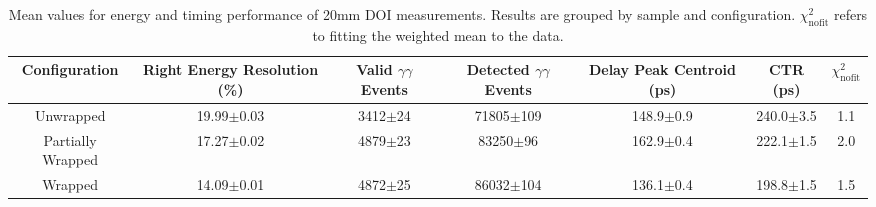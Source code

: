 \begin{table}
\caption{\label{tab:doictrresults-20} Mean values for energy and timing performance of 20mm DOI measurements. Results are grouped by sample and configuration. $\chi^2_\text{nofit}$ refers to fitting the weighted mean to the data.}
\begin{tabular}{ccccccc}
\hline
Configuration & Right Energy Resolution (\%) & Valid $\gamma\gamma$ Events & Detected $\gamma\gamma$ Events & Delay Peak Centroid (ps)  & CTR (ps) &  $\chi^2_\text{nofit}$ \\
\hline
        Unwrapped     &  19.99$\pm$0.03 &  3412$\pm$24 &  71805$\pm$109 &  148.9$\pm$0.9 &  240.0$\pm$3.5 &    1.1 \\
        Partially Wrapped   &  17.27$\pm$0.02 &  4879$\pm$23 &   83250$\pm$96 &  162.9$\pm$0.4 &  222.1$\pm$1.5 &    2.0 \\
        Wrapped       &  14.09$\pm$0.01 &  4872$\pm$25 &  86032$\pm$104 &  136.1$\pm$0.4 &  198.8$\pm$1.5 &    1.5 \\
\hline
\end{tabular}
\end{table}

